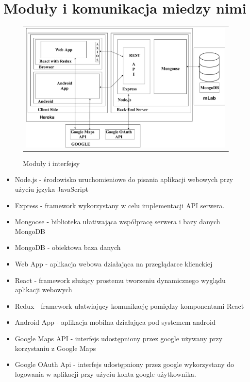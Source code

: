 \documentclass{sprawozdanie-agh}
\begin{document}
   


	\stronatytulowa{}

	\section{Moduły i komunikacja miedzy nimi}
	\begin{figure}[H] 
		\centering
		\begin{tabular}{c}
			\includegraphics[width=.95\textwidth]{moduly_interfejsy_komunikacyjne} 
		\end{tabular} 
		\caption{Moduły i interfejsy}
	\end{figure}
	
	\begin{itemize}
		\item Node.js - środowisko uruchomieniowe do pisania aplikacji webowych przy użyciu języka JavaScript
		\item Express - framework wykorzystany w celu implementacji API serwera.
		\item Mongoose -  biblioteka ułatiwająca współpracę serwera i bazy danych MongoDB
		\item MongoDB -  obiektowa baza danych
		\item Web App - aplikacja webowa działająca na przeglądarce klienckiej
		\item React - framework służący prostemu tworzeniu dynamicznego wyglądu aplikacji webowych 
		\item Redux -  framework ułatwiający komunikację pomiędzy komponentami React
		\item Android App - aplikacja mobilna działająca pod systemem android  
		\item Google Maps API - interfejs udostępniony przez google używany przy korzystaniu z Google Maps  
		\item Google OAuth Api - interfejs udostępniony przez google wykorzystany do logowania w aplikacji przy użyciu konta google użytkownika.
	\end{itemize}
\end{document}
